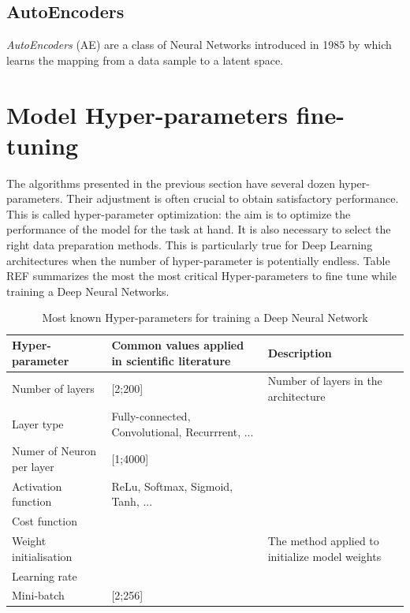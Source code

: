 \subsection{AutoEncoders}

\textit{AutoEncoders} (AE) are a class of Neural Networks introduced in 1985 by \cite{rumelhart1985learning} which learns the mapping from a data sample to a latent space.

\section{Model Hyper-parameters fine-tuning}

The algorithms presented in the previous section have several dozen hyper-parameters. Their adjustment is often crucial to obtain satisfactory performance. This is called hyper-parameter optimization: the aim is to optimize the performance of the model for the task at hand. It is also necessary to select the right data preparation methods. This is particularly true for Deep Learning architectures when the number of hyper-parameter is potentially endless. Table REF summarizes the most the most critical Hyper-parameters to fine tune while training a Deep Neural Networks.

\begin{table}[]
\caption{Most known Hyper-parameters for training a Deep Neural Network}
\label{tab:hyper-parameters}
\begin{tabular}{|l|p{4cm}|p{4cm}|}
\hline
Hyper-parameter           & Common values applied in scientific literature  & Description                                    \\ \hline
Number of layers          & {[}2;200{]}                                     & Number of layers in the architecture           \\ \hline
Layer type                & Fully-connected, Convolutional, Recurrrent, ... &                                                \\ \hline
Numer of Neuron per layer & {[}1;4000{]}                                    &                                                \\ \hline
Activation function       & ReLu, Softmax, Sigmoid, Tanh, ...               &                                                \\ \hline
Cost function             &                                                 &                                                \\ \hline
Weight initialisation     &                                                 & The method applied to initialize model weights \\ \hline
Learning rate             &                                                 &                                                \\ \hline
Mini-batch                & {[}2;256{]}                                     &                                                \\ \hline
\end{tabular}
\end{table}

